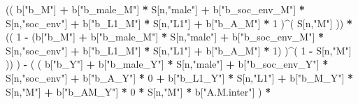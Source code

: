 \documentclass[
]{book}
\newenvironment{Shaded}{\begin{snugshade}}{\end{snugshade}}
\newcommand{\DecValTok}[1]{\textcolor[rgb]{0.00,0.00,0.81}{#1}}
\newcommand{\NormalTok}[1]{#1}
\newcommand{\SpecialCharTok}[1]{\textcolor[rgb]{0.81,0.36,0.00}{\textbf{#1}}}
\newcommand{\StringTok}[1]{\textcolor[rgb]{0.31,0.60,0.02}{#1}}
\begin{document}
\begin{Shaded}
\begin{Highlighting}[]
\NormalTok{                    (( b[}\StringTok{"b\_M"}\NormalTok{] }\SpecialCharTok{+} 
\NormalTok{                           b[}\StringTok{"b\_male\_M"}\NormalTok{] }\SpecialCharTok{*}\NormalTok{ S[n,}\StringTok{"male"}\NormalTok{] }\SpecialCharTok{+} 
\NormalTok{                           b[}\StringTok{"b\_soc\_env\_M"}\NormalTok{] }\SpecialCharTok{*}\NormalTok{ S[n,}\StringTok{"soc\_env"}\NormalTok{] }\SpecialCharTok{+} 
\NormalTok{                           b[}\StringTok{"b\_L1\_M"}\NormalTok{] }\SpecialCharTok{*}\NormalTok{ S[n,}\StringTok{"L1"}\NormalTok{] }\SpecialCharTok{+}
\NormalTok{                           b[}\StringTok{"b\_A\_M"}\NormalTok{] }\SpecialCharTok{*} \DecValTok{1}\NormalTok{ )}\SpecialCharTok{\^{}}\NormalTok{( S[n,}\StringTok{"M"}\NormalTok{] )) }\SpecialCharTok{*}
\NormalTok{                    (( }\DecValTok{1} \SpecialCharTok{{-}}\NormalTok{ (b[}\StringTok{"b\_M"}\NormalTok{] }\SpecialCharTok{+} 
\NormalTok{                              b[}\StringTok{"b\_male\_M"}\NormalTok{] }\SpecialCharTok{*}\NormalTok{ S[n,}\StringTok{"male"}\NormalTok{] }\SpecialCharTok{+} 
\NormalTok{                              b[}\StringTok{"b\_soc\_env\_M"}\NormalTok{] }\SpecialCharTok{*}\NormalTok{ S[n,}\StringTok{"soc\_env"}\NormalTok{] }\SpecialCharTok{+} 
\NormalTok{                              b[}\StringTok{"b\_L1\_M"}\NormalTok{] }\SpecialCharTok{*}\NormalTok{ S[n,}\StringTok{"L1"}\NormalTok{] }\SpecialCharTok{+}
\NormalTok{                              b[}\StringTok{"b\_A\_M"}\NormalTok{] }\SpecialCharTok{*} \DecValTok{1}\NormalTok{) )}\SpecialCharTok{\^{}}\NormalTok{( }\DecValTok{1} \SpecialCharTok{{-}}\NormalTok{ S[n,}\StringTok{"M"}\NormalTok{] )) ) }\SpecialCharTok{{-}} 
\NormalTok{                    ( ( b[}\StringTok{"b\_Y"}\NormalTok{] }\SpecialCharTok{+} 
\NormalTok{                          b[}\StringTok{"b\_male\_Y"}\NormalTok{] }\SpecialCharTok{*}\NormalTok{ S[n,}\StringTok{"male"}\NormalTok{] }\SpecialCharTok{+} 
\NormalTok{                          b[}\StringTok{"b\_soc\_env\_Y"}\NormalTok{] }\SpecialCharTok{*}\NormalTok{ S[n,}\StringTok{"soc\_env"}\NormalTok{] }\SpecialCharTok{+} 
\NormalTok{                          b[}\StringTok{"b\_A\_Y"}\NormalTok{] }\SpecialCharTok{*} \DecValTok{0} \SpecialCharTok{+} 
\NormalTok{                          b[}\StringTok{"b\_L1\_Y"}\NormalTok{] }\SpecialCharTok{*}\NormalTok{ S[n,}\StringTok{"L1"}\NormalTok{] }\SpecialCharTok{+}
\NormalTok{                          b[}\StringTok{"b\_M\_Y"}\NormalTok{] }\SpecialCharTok{*}\NormalTok{ S[n,}\StringTok{"M"}\NormalTok{] }\SpecialCharTok{+}
\NormalTok{                          b[}\StringTok{"b\_AM\_Y"}\NormalTok{] }\SpecialCharTok{*} \DecValTok{0} \SpecialCharTok{*}\NormalTok{ S[n,}\StringTok{"M"}\NormalTok{] }\SpecialCharTok{*}\NormalTok{ b[}\StringTok{"A.M.inter"}\NormalTok{] ) }\SpecialCharTok{*}

\end{Highlighting}
\end{Shaded}
\end{document}
